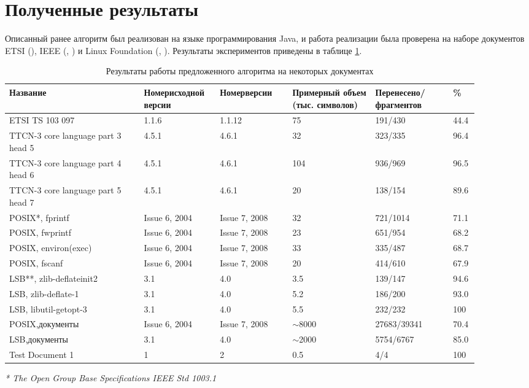 \section{Полученные результаты}
\label{sec:Chapter5} 

Описанный ранее алгоритм был реализован на языке программирования Java, и работа реализации была проверена на наборе документов ETSI (\cite{web:etsi461}), IEEE (\cite{web:POSIX2004}, \cite{web:POSIX2008}) и Linux Foundation (\cite{web:LSB3}, \cite{web:LSB4}). Результаты экспериментов приведены в таблице \ref{tabular:results}.

\begin{table}[H]
\caption{Результаты работы предложенного алгоритма на некоторых документах}
\label{tabular:results}
\begin{center}
\begin{tabular}{|p{0.26\linewidth}|p{0.14\linewidth}|p{0.14\linewidth}|p{0.16\linewidth}|p{0.15\linewidth}|p{0.04\linewidth}|}
\hline
\textbf{Название} & \textbf{Номер\newline исходной версии} & \textbf{Номер\newline версии} & \textbf{Примерный объем (тыс. символов)} & \textbf{Перенесено/\newline фрагментов} & \textbf{\%} \\
\hline
ETSI TS 103 097 & 1.1.6 & 1.1.12 & 75 & 191/430 &  44.4\\
\hline
TTCN-3 core language part 3 head 5 & 4.5.1 & 4.6.1 & 32 & 323/335 & 96.4\\
\hline
TTCN-3 core language part 4 head 6 & 4.5.1 & 4.6.1 & 104 & 936/969 & 96.5\\
\hline
TTCN-3 core language part 5 head 7 & 4.5.1 & 4.6.1 & 20 & 138/154 & 89.6\\
\hline
POSIX*, fprintf & Issue 6, 2004 & Issue 7, 2008 & 32 & 721/1014 & 71.1\\
\hline
POSIX, fwprintf & Issue 6, 2004 & Issue 7, 2008 & 23 & 651/954 & 68.2\\
\hline
POSIX, environ(exec) & Issue 6, 2004 & Issue 7, 2008 & 33 & 335/487 & 68.7\\
\hline
POSIX, fscanf & Issue 6, 2004 & Issue 7, 2008 & 20 & 414/610 & 67.9\\
\hline
LSB**, zlib-deflateinit2 & 3.1 & 4.0 & 3.5 & 139/147 & 94.6\\
\hline
LSB, zlib-deflate-1 & 3.1 & 4.0 & 5.2 & 186/200 & 93.0\\
\hline
LSB, libutil-getopt-3 & 3.1 & 4.0 & 5.5 & 232/232 & 100\\
\hline
POSIX, документы & Issue 6, 2004 & Issue 7, 2008 & $\sim$8000 & 27683/39341 & 70.4\\
\hline
LSB, документы & 3.1 & 4.0 & $\sim$2000 & 5754/6767 & 85.0\\
\hline
Test Document 1 & 1 & 2 & 0.5 & 4/4 & 100 \\
\hline
\end{tabular}
\end{center}
\emph{* The Open Group Base Specifications IEEE Std 1003.1}


\end{table}
